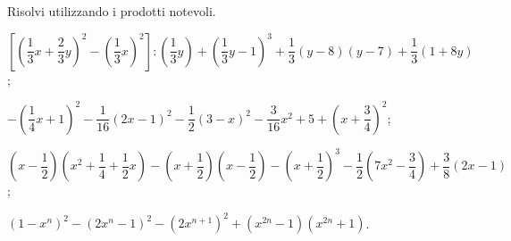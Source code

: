 \begin{esercizio}[\Ast]
 \label{ese:12.42}
Risolvi utilizzando i prodotti notevoli.
 \begin{enumeratea}
 \item $\left[\left(\dfrac{1}{3}x+\dfrac{2}{3}y\right)^{2}-\left(\dfrac{1}{3}x\right)^{2}\right]:\left(\dfrac{1}{3}y\right)+\left(\dfrac{1}{3}y-1\right)^{3}+\dfrac{1}{3}(y-8)(y-7)+\dfrac{1}{3}(1+8y)$;
 \item $-\left(\dfrac{1}{4}x+1\right)^{2}-\dfrac{1}{16}(2x-1)^{2}-\dfrac{1}{2}(3-x)^{2}-\dfrac{3}{16}x^{2}+5+\left(x+\dfrac{3}{4}\right)^{2}$;
 \item $\left(x-\dfrac{1}{2}\right)\left(x^{2}+\dfrac{1}{4}+\dfrac{1}{2}x\right)-\left(x+\dfrac{1}{2}\right)\left(x-\dfrac{1}{2}\right)-\left(x+\dfrac{1}{2}\right)^{3}-\dfrac{1}{2}\left(7x^{2}-\dfrac{3}{4}\right)+\dfrac{3}{8}(2x-1)$;
 \item $\left(1-x^{n}\right)^{2}-\left(2x^{n}-1\right)^{2}-\left(2x^{n+1}\right)^{2}+\left(x^{2n}-1\right)\left(x^{2n}+1\right)$.
 \end{enumeratea}
\end{esercizio}

